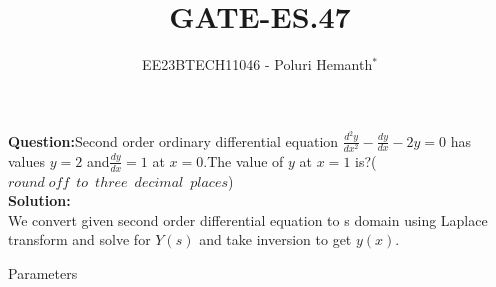 \documentclass[journal,12pt,twocolumn]{IEEEtran}
\theoremstyle{remark}
\begin{document}

\vspace{3cm}

\title{GATE-ES.47}
\author{EE23BTECH11046 - Poluri Hemanth$^{*}$}
\maketitle
\textbf{Question:}Second order ordinary differential equation $\frac{d^2y}{dx^2}-\frac{dy}{dx}-2y=0$ has values 
$y=2$ and$\frac{dy}{dx}=1$ at $x=0$.The value of $y$ at $x=1$ is?($round\; off\;\: to\;\: three\;\: decimal\;\: places$)
\\
\textbf{Solution:}\\
We convert given second order differential equation to s domain using Laplace transform and solve for $Y(s)$ and take inversion to get $y(x)$.
\begin{table}[h!]
	
        \caption{Parameters}
        \label{tab:es.47}
\end{table}
\end{document}

